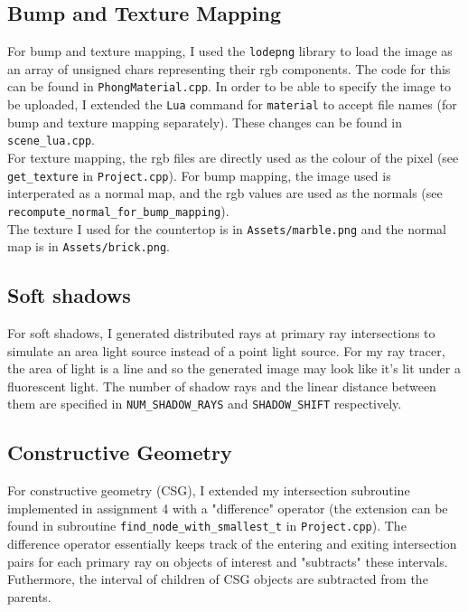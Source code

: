 \documentclass{article}
\begin{document}
\subsection{Bump and Texture Mapping}
For bump and texture mapping, I used the \texttt{lodepng} library to load the image as an array of unsigned chars representing their rgb components. The code for this can be found in \texttt{PhongMaterial.cpp}. In order to be able to specify the image to be uploaded, I extended the \texttt{Lua} command for \texttt{material} to accept file names (for bump and texture mapping separately). These changes can be found in \texttt{scene\_lua.cpp}. \\

For texture mapping, the rgb files are directly used as the colour of the pixel (see \texttt{get\_texture} in \texttt{Project.cpp}). For bump mapping, the image used is interperated as a normal map, and the rgb values are used as the normals (see \texttt{recompute\_normal\_for\_bump\_mapping}). \\

The texture I used for the countertop is in \texttt{Assets/marble.png} and the normal map is in \texttt{Assets/brick.png}.

\subsection{Soft shadows}
For soft shadows, I generated distributed rays at primary ray intersections to simulate an area light source instead of a point light source. For my ray tracer, the area of light is a line and so the generated image may look like it's lit under a fluorescent light. The number of shadow rays and the linear distance between them are specified in \texttt{NUM\_SHADOW\_RAYS} and \texttt{SHADOW\_SHIFT} respectively.

\subsection{Constructive Geometry}
For constructive geometry (CSG), I extended my intersection subroutine implemented in assignment 4 with a "difference" operator (the extension can be found in subroutine \texttt{find\_node\_with\_smallest\_t} in \texttt{Project.cpp}). The difference operator essentially keeps track of the entering and exiting intersection pairs for each primary ray on objects of interest and "subtracts" these intervals. Futhermore, the interval of children of CSG objects are subtracted from the parents. \\
\end{document}
